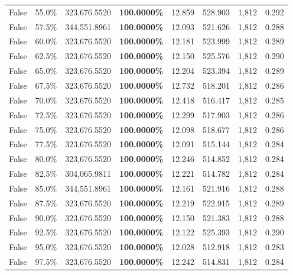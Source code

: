 \begin{table}[H]
\begin{tabular}{lllrllll}
\cline{1-8}
False & 55.0\% & 323,676.5520 & \bfseries \color{red} 100.0000\% & 12.859 & 528.903 & 1,812 & 0.292 \\
\cline{1-8}
False & 57.5\% & 344,551.8961 & \bfseries \color{red} 100.0000\% & 12.093 & 521.626 & 1,812 & 0.288 \\
\cline{1-8}
False & 60.0\% & 323,676.5520 & \bfseries \color{red} 100.0000\% & 12.181 & 523.999 & 1,812 & 0.289 \\
\cline{1-8}
False & 62.5\% & 323,676.5520 & \bfseries \color{red} 100.0000\% & 12.150 & 525.576 & 1,812 & 0.290 \\
\cline{1-8}
False & 65.0\% & 323,676.5520 & \bfseries \color{red} 100.0000\% & 12.204 & 523.394 & 1,812 & 0.289 \\
\cline{1-8}
False & 67.5\% & 323,676.5520 & \bfseries \color{red} 100.0000\% & 12.732 & 518.201 & 1,812 & 0.286 \\
\cline{1-8}
False & 70.0\% & 323,676.5520 & \bfseries \color{red} 100.0000\% & 12.418 & 516.417 & 1,812 & 0.285 \\
\cline{1-8}
False & 72.5\% & 323,676.5520 & \bfseries \color{red} 100.0000\% & 12.299 & 517.903 & 1,812 & 0.286 \\
\cline{1-8}
False & 75.0\% & 323,676.5520 & \bfseries \color{red} 100.0000\% & 12.098 & 518.677 & 1,812 & 0.286 \\
\cline{1-8}
False & 77.5\% & 323,676.5520 & \bfseries \color{red} 100.0000\% & 12.091 & 515.144 & 1,812 & 0.284 \\
\cline{1-8}
False & 80.0\% & 323,676.5520 & \bfseries \color{red} 100.0000\% & 12.246 & 514.852 & 1,812 & 0.284 \\
\cline{1-8}
False & 82.5\% & \color{red} 304,065.9811 & \bfseries \color{red} 100.0000\% & 12.221 & 514.782 & 1,812 & 0.284 \\
\cline{1-8}
False & 85.0\% & 344,551.8961 & \bfseries \color{red} 100.0000\% & 12.161 & 521.916 & 1,812 & 0.288 \\
\cline{1-8}
False & 87.5\% & 323,676.5520 & \bfseries \color{red} 100.0000\% & 12.219 & 522.915 & 1,812 & 0.289 \\
\cline{1-8}
False & 90.0\% & 323,676.5520 & \bfseries \color{red} 100.0000\% & 12.150 & 521.383 & 1,812 & 0.288 \\
\cline{1-8}
False & 92.5\% & 323,676.5520 & \bfseries \color{red} 100.0000\% & 12.122 & 525.393 & 1,812 & 0.290 \\
\cline{1-8}
False & 95.0\% & 323,676.5520 & \bfseries \color{red} 100.0000\% & 12.028 & 512.918 & 1,812 & 0.283 \\
\cline{1-8}
False & 97.5\% & 323,676.5520 & \bfseries \color{red} 100.0000\% & 12.242 & 514.831 & 1,812 & 0.284 \\
\cline{1-8}
\bottomrule
\end{tabular}
\end{table}
